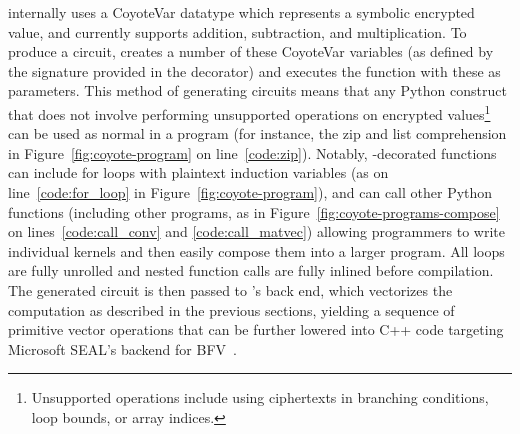 \system internally uses a {\sf CoyoteVar} datatype which represents a symbolic encrypted value, and currently supports addition, subtraction, and multiplication.
To produce a circuit, \system creates a number of these {\sf CoyoteVar} variables (as defined by the signature provided in the decorator) and executes the function with these as parameters.
This method of generating circuits means that any Python construct that does not involve performing unsupported operations on encrypted values\footnote{Unsupported operations include using ciphertexts in branching conditions, loop bounds, or array indices.} can be used as normal in a \system program (for instance, the {\sf zip} and list comprehension in Figure~\ref{fig:coyote-program} on line~\ref{code:zip}).
Notably, \system-decorated functions can include for loops with plaintext induction variables (as on line~\ref{code:for_loop} in Figure~\ref{fig:coyote-program}), and can call other Python functions (including other \system programs, as in Figure~\ref{fig:coyote-programs-compose} on lines~\ref{code:call_conv} and \ref{code:call_matvec}) allowing programmers to write individual kernels and then easily compose them into a larger program.
All loops are fully unrolled and nested function calls are fully inlined before compilation.
The generated circuit is then passed to \system's back end, which vectorizes the computation as described in the previous sections, yielding a sequence of primitive vector operations that can be further lowered into C++ code targeting Microsoft SEAL's backend for BFV~\cite{seal}.







